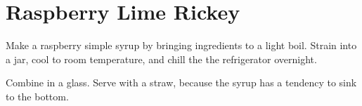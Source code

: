 \section{Raspberry Lime Rickey}
\begin{recipe}


Make a raspberry simple syrup by bringing ingredients to a light boil.
Strain into a jar, cool to room temperature, and chill the the refrigerator 
overnight. 

    
Combine in a glass. Serve with a straw, because the syrup has a tendency to sink
to the bottom. 

\end{recipe}
